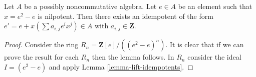 \begin{lemma}
\label{lemma-lift-idempotents-noncommutative}
Let $A$ be a possibly noncommutative algebra.
Let $e \in A$ be an element such that $x = e^2 - e$ is nilpotent.
Then there exists an idempotent of the form
$e' = e + x(\sum a_{i, j}e^ix^j) \in A$
with $a_{i, j} \in \mathbf{Z}$.
\end{lemma}

\begin{proof}
Consider the ring $R_n = \mathbf{Z}[e]/((e^2 - e)^n)$. It is clear that
if we can prove the result for each $R_n$ then the lemma follows.
In $R_n$ consider the ideal $I = (e^2 - e)$ and apply
Lemma \ref{lemma-lift-idempotents}.
\end{proof}